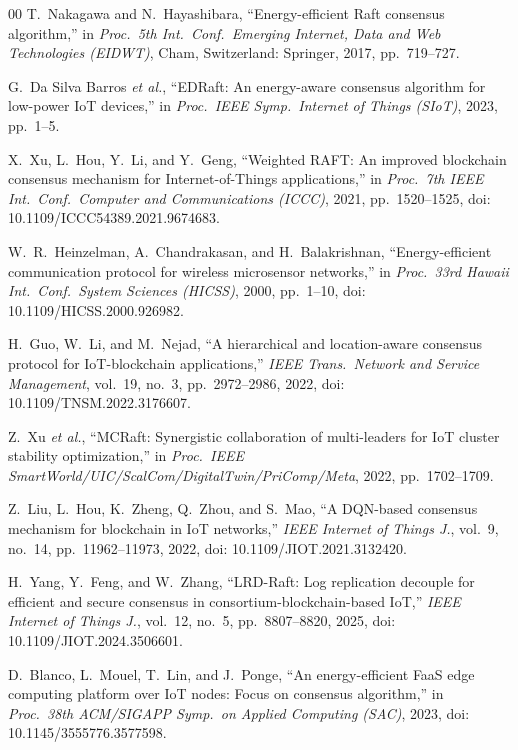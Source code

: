 \documentclass[conference]{IEEEtran}
\begin{document}
\begin{thebibliography}{00}
T.~Nakagawa and N.~Hayashibara, ``Energy-efficient Raft consensus
algorithm,'' in \emph{Proc.\ 5th Int.\ Conf.\ Emerging Internet, Data
and Web Technologies (EIDWT)}, Cham, Switzerland: Springer, 2017,
pp.~719--727.

G.~{Da Silva Barros} \emph{et al.}, ``EDRaft: An energy-aware consensus
algorithm for low-power IoT devices,'' in \emph{Proc.\ IEEE Symp.\
Internet of Things (SIoT)}, 2023, pp.~1--5.

X.~Xu, L.~Hou, Y.~Li, and Y.~Geng, ``Weighted RAFT: An improved
blockchain consensus mechanism for Internet-of-Things applications,''
in \emph{Proc.\ 7th IEEE Int.\ Conf.\ Computer and Communications
(ICCC)}, 2021, pp.~1520--1525, doi: 10.1109/ICCC54389.2021.9674683.

W.~R.~Heinzelman, A.~Chandrakasan, and H.~Balakrishnan, ``Energy-efficient
communication protocol for wireless microsensor networks,'' in
\emph{Proc.\ 33rd Hawaii Int.\ Conf.\ System Sciences (HICSS)}, 2000,
pp.~1--10, doi: 10.1109/HICSS.2000.926982.

H.~Guo, W.~Li, and M.~Nejad, ``A hierarchical and location-aware
consensus protocol for IoT-blockchain applications,'' \emph{IEEE Trans.\
Network and Service Management}, vol.~19, no.~3, pp.~2972--2986, 2022,
doi: 10.1109/TNSM.2022.3176607.

Z.~Xu \emph{et al.}, ``MCRaft: Synergistic collaboration of
multi-leaders for IoT cluster stability optimization,'' in
\emph{Proc.\ IEEE SmartWorld/UIC/ScalCom/DigitalTwin/PriComp/Meta},
2022, pp.~1702--1709.

Z.~Liu, L.~Hou, K.~Zheng, Q.~Zhou, and S.~Mao, ``A DQN-based consensus
mechanism for blockchain in IoT networks,'' \emph{IEEE Internet of
Things J.}, vol.~9, no.~14, pp.~11962--11973, 2022, doi:
10.1109/JIOT.2021.3132420.

H.~Yang, Y.~Feng, and W.~Zhang, ``LRD-Raft: Log replication decouple
for efficient and secure consensus in consortium-blockchain-based
IoT,'' \emph{IEEE Internet of Things J.}, vol.~12, no.~5,
pp.~8807--8820, 2025, doi: 10.1109/JIOT.2024.3506601.

D.~Blanco, L.~Mouel, T.~Lin, and J.~Ponge, ``An energy-efficient FaaS
edge computing platform over IoT nodes: Focus on consensus
algorithm,'' in \emph{Proc.\ 38th ACM/SIGAPP Symp.\ on Applied
Computing (SAC)}, 2023, doi: 10.1145/3555776.3577598.


\end{thebibliography}
\end{document}
